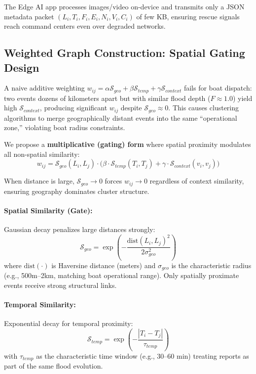 \documentclass[runningheads]{llncs}
\begin{document}
The Edge AI app processes images/video on-device and transmits only a JSON metadata packet $(L_i, T_i, F_i, E_i, N_i, V_i, C_i)$ of few KB, ensuring rescue signals reach command centers even over degraded networks.

\subsection{Weighted Graph Construction: Spatial Gating Design}

A naive additive weighting $w_{ij} = \alpha \mathcal{S}_{geo} + \beta \mathcal{S}_{temp} + \gamma \mathcal{S}_{context}$ fails for boat dispatch: two events dozens of kilometers apart but with similar flood depth ($F \approx 1.0$) yield high $\mathcal{S}_{context}$, producing significant $w_{ij}$ despite $\mathcal{S}_{geo} \approx 0$. This causes clustering algorithms to merge geographically distant events into the same ``operational zone,'' violating boat radius constraints.

We propose a \textbf{multiplicative (gating) form} where spatial proximity modulates all non-spatial similarity:
\begin{equation}\label{eq:weight}
w_{ij} = \mathcal{S}_{geo}(L_i, L_j) \cdot \Big( \beta \cdot \mathcal{S}_{temp}(T_i, T_j) + \gamma \cdot \mathcal{S}_{context}(v_i, v_j) \Big)
\end{equation}

When distance is large, $\mathcal{S}_{geo} \to 0$ forces $w_{ij} \to 0$ regardless of context similarity, ensuring geography dominates cluster structure.

\paragraph{Spatial Similarity (Gate):}
Gaussian decay penalizes large distances strongly:
\begin{equation}
\mathcal{S}_{geo} = \exp\left( - \frac{\text{dist}(L_i, L_j)^2}{2\sigma_{geo}^2} \right)
\end{equation}
where $\text{dist}(\cdot)$ is Haversine distance (meters) and $\sigma_{geo}$ is the characteristic radius (e.g., 500m--2km, matching boat operational range). Only spatially proximate events receive strong structural links.

\paragraph{Temporal Similarity:}
Exponential decay for temporal proximity:
\begin{equation}
\mathcal{S}_{temp} = \exp\left( - \frac{|T_i - T_j|}{\tau_{temp}} \right)
\end{equation}
with $\tau_{temp}$ as the characteristic time window (e.g., 30--60 min) treating reports as part of the same flood evolution.
\end{document}

